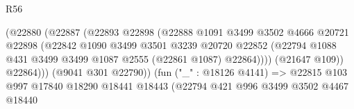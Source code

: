 \begin{lexlean}{R56}
\begin{coremodule}
                                              (@22880
                                                (@22887
                                                  (@22893
                                                    @22898
                                                    (@22888
                                                      @1091
                                                      @3499
                                                      @3502
                                                      @4666
                                                      @20721
                                                      @22898
                                                      (@22842
                                                        @1090
                                                        @3499
                                                        @3501
                                                        @3239
                                                        @20720
                                                        @22852
                                                        (@22794
                                                          @1088
                                                          @431
                                                          @3499
                                                          @3499
                                                          @1087
                                                          @2555
                                                          (@22861 @1087)
                                                          @22864))))
                                                  (@21647 @109))
                                                @22864)))
                                          (@9041 @301 @22790))
                                        (fun ("_" : @18126 @4141) =>
                                        @22815
                                          @103
                                          @997
                                          @17840
                                          @18290
                                          @18441
                                          @18443
                                          (@22794
                                            @421
                                            @996
                                            @3499
                                            @3502
                                            @4467
                                            @18440

\end{coremodule}
\end{lexlean}
